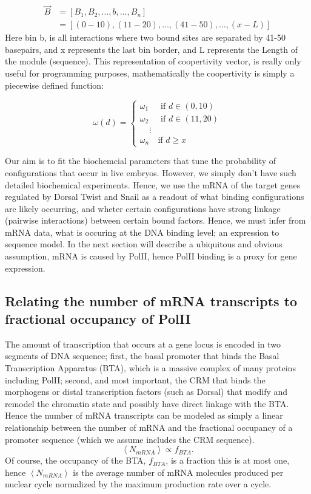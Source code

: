\begin{equation}\label{}
\begin{split}
 \overrightarrow{B}   &= [ B_1 ,B_2 ,\ldots, b, \ldots, B_n ] \\
     &=   [ (0-10), (11-20), \ldots,(41-50),\ldots, (x-L)]
    \end{split}
\end{equation}
Here bin b, is all interactions where two bound sites are separated by 41-50 basepairs, and x represents the last bin border, and L represents the Length of the module (sequence).  This representation of coopertivity vector, is really only useful for programming purposes, mathematically the coopertivity is simply a piecewise defined function:


\[
  \omega(d) =
  \begin{cases}
   \omega_1  & \text{ if } d \in (0,10)  \\
   \omega_2  & \text{ if } d \in (11,20)  \\
   \ \ \ \ \ \vdots \\
 \omega_n  & \text{if } d \geq x
  \end{cases}
\]

Our aim is to fit the biochemcial parameters that tune the probability of configurations that occur in live embryos.  However, we simply don't have such detailed biochemical experiments.  Hence, we use the mRNA of the target genes regulated by Dorsal Twist and Snail as a readout of what binding configurations are likely occurring, and wheter certain configurations have strong linkage (pairwise interactions) between certain bound factors.  Hence, we must infer from mRNA data, what is occuring at the DNA binding level; an expression to sequence model.  In the next section will describe a ubiquitous and obvious assumption, mRNA is caused by PolII, hence PolII binding is a proxy for gene expression.
 
\subsection{ Relating the number of mRNA transcripts to fractional occupancy of PolII }
The amount of transcription that occurs at a gene locus is encoded in two segments of DNA sequence; first, the basal promoter that binds the Basal Transcription Apparatus (BTA), which is a massive complex of many proteins including PolII; second, and most important, the CRM that binds the morphogens or distal transcription factors (such as Dorsal) that modify and remodel the chromatin state and possibly have direct linkage with the BTA.  Hence the number of mRNA transcripts can be modeled as simply a linear relationship between the number of mRNA and the fractional occupancy of a promoter sequence (which we assume includes the CRM sequence).
\begin{equation}\label{}
     \left< N_{mRNA} \right>  \propto f_{BTA}.
\end{equation}
Of course, the occupancy of the BTA, $f_{BTA}$,  is a fraction this is at most one, hence $\left< N_{mRNA} \right> $ is the average number of mRNA molecules produced per nuclear cycle normalized by the maximum production rate over a cycle. 



 

